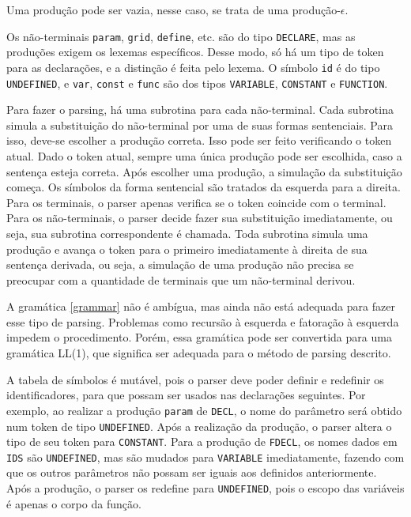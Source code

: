 \documentclass[10pt,a4paper]{article}
\begin{document}
\newpage


Uma produção pode ser vazia, nesse caso, se trata de uma produção-$\epsilon$.

Os não-terminais \texttt{param}, \texttt{grid}, \texttt{define}, etc. são do tipo \texttt{DECLARE},
mas as produções exigem os lexemas específicos.
Desse modo, só há um tipo de token para as declarações, e a distinção é feita pelo lexema.
O símbolo \texttt{id} é do tipo \texttt{UNDEFINED}, e \texttt{var},
\texttt{const} e \texttt{func} são dos tipos \texttt{VARIABLE}, \texttt{CONSTANT} e \texttt{FUNCTION}.

Para fazer o parsing, há uma subrotina para cada não-terminal.
Cada subrotina simula a substituição do não-terminal por uma de suas formas sentenciais.
Para isso, deve-se escolher a produção correta. Isso pode ser feito verificando o token atual.
Dado o token atual, sempre uma única produção pode ser escolhida, caso a sentença esteja correta.
Após escolher uma produção, a simulação da substituição começa.
Os símbolos da forma sentencial são tratados da esquerda para a direita.
Para os terminais, o parser apenas verifica se o token coincide com o terminal.
Para os não-terminais, o parser decide fazer sua substituição imediatamente,
ou seja, sua subrotina correspondente é chamada. Toda subrotina simula uma produção e avança o token para o primeiro imediatamente à direita de sua sentença derivada, ou seja, a simulação de uma produção não precisa se preocupar com a quantidade de terminais que um não-terminal derivou.

A gramática \ref{grammar} não é ambígua, mas ainda não está adequada para fazer esse tipo de parsing.
Problemas como recursão à esquerda e fatoração à esquerda impedem o procedimento.
Porém, essa gramática pode ser convertida para uma gramática LL(1),
que significa ser adequada para o método de parsing descrito.

A tabela de símbolos é mutável, pois o parser deve poder definir e redefinir os identificadores,
para que possam ser usados nas declarações seguintes.
Por exemplo, ao realizar a produção \texttt{param} de \texttt{DECL},
o nome do parâmetro será obtido num token de tipo \texttt{UNDEFINED}.
Após a realização da produção, o parser altera o tipo de seu token para \texttt{CONSTANT}.
Para a produção de \texttt{FDECL}, os nomes dados em \texttt{IDS} são \texttt{UNDEFINED},
mas são mudados para \texttt{VARIABLE} imediatamente, fazendo com que
os outros parâmetros não possam ser iguais aos definidos anteriormente.
Após a produção, o parser os redefine para \texttt{UNDEFINED}, pois o escopo das variáveis é apenas o corpo da função.
\end{document}
